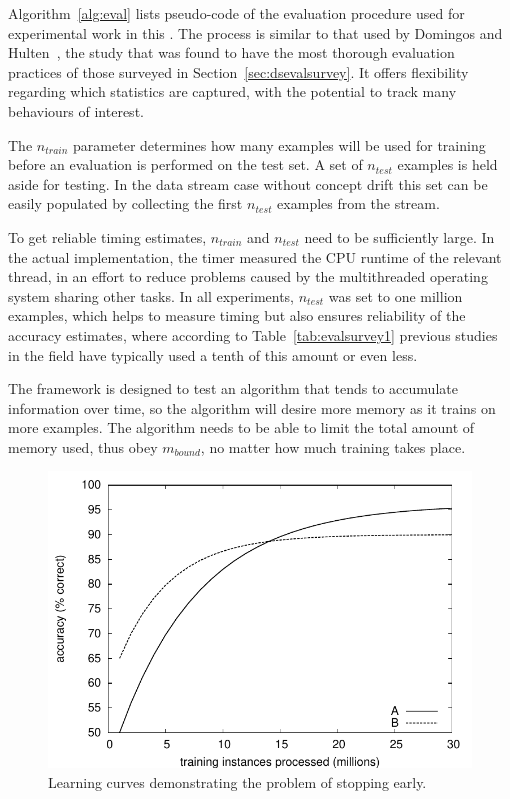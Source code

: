 Algorithm~\ref{alg:eval} lists pseudo-code of the evaluation procedure used for experimental work in this \thesisc. The process is similar to that used by Domingos and Hulten~\cite{vfdt}, the study that was found to have the most thorough evaluation practices of those surveyed in Section~\ref{sec:dsevalsurvey}. It offers flexibility regarding which statistics are captured, with the potential to track many behaviours of interest.

The $n_{train}$ parameter determines how many examples will be used for training before an evaluation is performed on the test set. A set of $n_{test}$ examples is held aside for testing. In the data stream case without concept drift this set can be easily populated by collecting the first $n_{test}$ examples from the stream.

To get reliable timing estimates, $n_{train}$ and $n_{test}$ need to be sufficiently large. In the actual implementation, the timer measured the CPU runtime of the relevant thread, in an effort to reduce problems caused by the multithreaded operating system sharing other tasks. In all experiments, $n_{test}$ was set to one million examples, which helps to measure timing but also ensures reliability of the accuracy estimates, where according to Table~\ref{tab:evalsurvey1} previous studies in the field have typically used a tenth of this amount or even less.

The framework is designed to test an algorithm that tends to accumulate information over time, so the algorithm will desire more memory as it trains on more examples. The algorithm needs to be able to limit the total amount of memory used, thus obey $m_{bound}$, no matter how much training takes place.

\begin{figure}
\includegraphics{figures/AvsB}
\caption{Learning curves demonstrating the problem of stopping early.}
\label{fig:learningcurves}
\end{figure}

